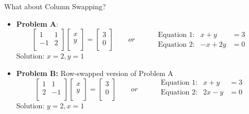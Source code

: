 \documentclass[10pt]{beamer}
\begin{document}
\begin{frame}{What about Column Swapping?}
\begin{itemize}
    \item \textbf{Problem A}: 
    $$
        \begin{bmatrix}
            1 &  1 \\
            -1 & 2 \\
        \end{bmatrix}
        \begin{bmatrix}
            x \\
            y \\
        \end{bmatrix}
        =
        \begin{bmatrix}
            3 \\
            0 \\
        \end{bmatrix}
    \quad\quad or \quad\quad 
    \begin{aligned}
        &\text{Equation 1:} & x + y  &= 3 \\
        &\text{Equation 2:} & -x + 2y  &= 0 
    \end{aligned}
    $$
    Solution: $x=2, y=1$
\item \textbf{Problem B:} Row-swapped version of Problem A
    $$
        \begin{bmatrix}
            1 & 1  \\
            2 & -1 \\
        \end{bmatrix}
        \begin{bmatrix}
            x \\
            y \\
        \end{bmatrix}
        =
        \begin{bmatrix}
            3 \\
            0 \\
        \end{bmatrix}
        \quad\quad or \quad\quad  
    \begin{aligned}
        &\text{Equation 1:} & x + y  &= 3 \\
        &\text{Equation 2:} & 2x  -y  &= 0 \\
    \end{aligned}
    $$
    Solution: $y=2, x=1$
\end{itemize}
\end{frame}
\end{document}
